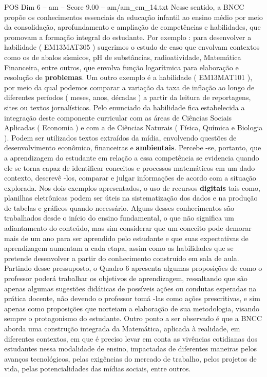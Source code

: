 \begin{textsample}{POS Dim 6 – am – Score 9.00 – am/am\_em\_14.txt}
Nesse sentido, a BNCC propõe os conhecimentos essenciais da educação infantil ao ensino médio por meio da consolidação, aprofundamento e ampliação de competências e habilidades, que promovam a formação integral do estudante.
Por exemplo : para desenvolver a habilidade ( EM13MAT305 ) sugerimos o estudo de caso que envolvam contextos como os de abalos sísmicos, pH de substâncias, radioatividade, Matemática Financeira, entre outros, que envolva função logarítmica para elaboração e resolução de \textbf{problemas}.
Um outro exemplo é a habilidade ( EM13MAT101 ), por meio da qual podemos comparar a variação da taxa de inflação ao longo de diferentes períodos ( meses, anos, décadas ) a partir da leitura de reportagens, sites ou textos jornalísticos.
Pelo enunciado da habilidade fica estabelecida a integração deste componente curricular com as áreas de Ciências Sociais Aplicadas ( Economia ) e com a de Ciências Naturais ( Física, Química e Biologia ).
Podem ser utilizados textos extraídos da mídia, envolvendo questões de desenvolvimento econômico, financeiras e \textbf{ambientais}.
Percebe -se, portanto, que a aprendizagem do estudante em relação a essa competência se evidencia quando ele se torna capaz de identificar conceitos e processos matemáticos em um dado contexto, descrevê -los, comparar e julgar informações de acordo com a situação explorada.
Nos dois exemplos apresentados, o uso de recursos \textbf{digitais} tais como, planilhas eletrônicas podem ser úteis na sistematização dos dados e na produção de tabelas e gráficos quando necessário.
Alguns desses conhecimentos são trabalhados desde o início do ensino fundamental, o que não significa um adiantamento do conteúdo, mas sim considerar que um conceito pode demorar mais de um ano para ser aprendido pelo estudante e que suas expectativas de aprendizagem aumentam a cada etapa, assim como as habilidades que se pretende desenvolver a partir do conhecimento construído em sala de aula.
Partindo desse pressuposto, o Quadro 6 apresenta algumas proposições de como o professor poderá trabalhar os objetivos de aprendizagem, ressaltando que são apenas algumas sugestões didáticas de possíveis ações ou condutas esperadas na prática docente, não devendo o professor tomá -las como ações prescritivas, e sim apenas como proposições que norteiam a elaboração de sua metodologia, visando sempre o protagonismo do estudante.
Outro ponto a ser observado é que a BNCC aborda uma construção integrada da Matemática, aplicada à realidade, em diferentes contextos, em que é preciso levar em conta as vivências cotidianas dos estudantes nessa modalidade de ensino, impactadas de diferentes maneiras pelos avanços tecnológicos, pelas exigências do mercado de trabalho, pelos projetos de vida, pelas potencialidades das mídias sociais, entre outros.

\end{textsample}
